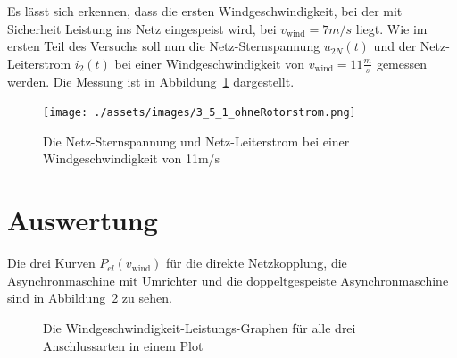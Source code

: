 \documentclass{report}
\begin{document}
Es lässt sich erkennen, dass die ersten Windgeschwindigkeit, bei der mit Sicherheit Leistung ins Netz eingespeist wird, bei $v_{\mathrm{wind}} = 7m/s$ liegt. Wie im ersten Teil des Versuchs soll nun die Netz-Sternspannung $u_{2N}(t)$ und der Netz-Leiterstrom $i_{2}(t)$ bei einer Windgeschwindigkeit von $v_{\mathrm{wind}} = 11 \frac{m}{s}$ gemessen werden. Die Messung ist in Abbildung~\ref{fig:oszi_dopp} dargestellt.

\begin{figure}[!ht]
	\centering
	\texttt{[image: ./assets/images/3\_5\_1\_ohneRotorstrom.png]}
	\caption{Die Netz-Sternspannung und Netz-Leiterstrom bei einer Windgeschwindigkeit von 11m/s}
	\label{fig:oszi_dopp}
\end{figure}

\section{Auswertung}
\label{sec:auswertung}

Die drei Kurven $P_{el}(v_{\mathrm{wind}})$ für die direkte Netzkopplung, die Asynchronmaschine mit Umrichter und die doppeltgespeiste Asynchronmaschine sind in Abbildung~\ref{fig:auswertung_pel} zu sehen.

\begin{figure}[!ht]
	\centering

	\caption{Die Windgeschwindigkeit-Leistungs-Graphen für alle drei Anschlussarten in einem Plot}
	\label{fig:auswertung_pel}
\end{figure}

\end{document}
